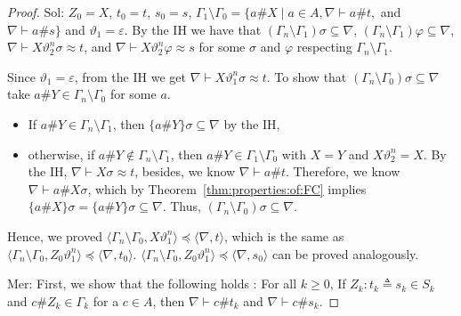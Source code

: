 \documentclass[11pt,a4paper]{amsart}
\theoremstyle{definition}
\newcommand{\np}[2]{\langle #1, \allowbreak #2\rangle}
\newcommand{\Atoms}{A}
\begin{document}
\begin{proof}
{\sf Sol:} $Z_0=X$, $t_0=t$, $s_0=s$, $\Gamma_1\setminus
\Gamma_0=\{a\#X \mid a\in \Atoms, \nabla \vdash a\#t,$ and $\nabla
\vdash a\#s \}$ and $\vartheta_1=\varepsilon$.  By the IH we have that
$(\Gamma_n\setminus \Gamma_1)\sigma \subseteq \nabla$,
$(\Gamma_n\setminus \Gamma_1)\varphi \subseteq \nabla$, $\nabla \vdash
X\vartheta_2^n\sigma \approx t$, and $\nabla \vdash
X\vartheta_2^n\varphi \approx s$ for some $\sigma$ and $\varphi$
respecting $\Gamma_n\setminus \Gamma_1$.

Since $\vartheta_1=\varepsilon$, from the IH we get $\nabla \vdash
X\vartheta_1^n\sigma \approx t$. To show that $(\Gamma_n\setminus
\Gamma_0)\sigma \subseteq \nabla$ take $a\# Y\in \Gamma_n\setminus
\Gamma_0$ for some $a$.

\begin{itemize}
\item  If $a\# Y\in\Gamma_n\setminus \Gamma_1$, then $\{a\# Y\}\sigma \subseteq \nabla$ by the IH,
\item otherwise, if $a\# Y\notin \Gamma_n\setminus
\Gamma_1$, then  $a\# Y\in \Gamma_1\setminus \Gamma_0$
with $X=Y$ and $X\vartheta_2^n =X$. By the IH, $\nabla
\vdash X\sigma \approx t$, besides, we know $\nabla \vdash
a\#t$. Therefore, we know $\nabla \vdash a\#X\sigma$, which by
Theorem~\ref{thm:properties:of:FC} implies $\{a\# X\}\sigma=\{a\#
Y\}\sigma \subseteq \nabla$. Thus, $(\Gamma_n\setminus \Gamma_0)\sigma
\subseteq \nabla$.
\end{itemize}

 Hence, we proved $\np{\Gamma_n\setminus
   \Gamma_0}{X\vartheta_1^n}\preceq \np{\nabla}{t}$, which is the same
 as $\np{\Gamma_n\setminus \Gamma_0}{Z_0\vartheta_1^n}\preceq
 \np{\nabla}{t_0}$.  $\np{\Gamma_n\setminus
   \Gamma_0}{Z_0\vartheta_1^n}\preceq \np{\nabla}{s_0}$ can be proved
 analogously. \vspace{0.3cm}




{\sf Mer:} First, we show that the following holds : For all $k\ge 0$, If $Z_k:t_k\triangleq s_k \in S_k$ and $c\#Z_k\in \Gamma_k$ for a $c\in A$, then $\nabla \vdash c\# t_k$ and $\nabla \vdash c\# s_k$. 


\end{proof}
\end{document}
